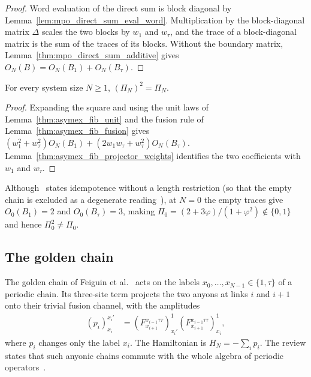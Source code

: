 \begin{proof}
    \leanok
    Word evaluation of the direct sum is block diagonal by
    Lemma~\ref{lem:mpo_direct_sum_eval_word}. Multiplication by the
    block-diagonal matrix $\Delta$ scales the two blocks by $w_1$ and
    $w_\tau$, and the trace of a block-diagonal matrix is the sum of the
    traces of its blocks. Without the boundary matrix,
    Lemma~\ref{thm:mpo_direct_sum_additive} gives
    $O_N(B)=O_N(B_1)+O_N(B_\tau)$.
\end{proof}

\begin{lemma}
    \label{thm:asymex_fib_projector_idempotent}
    \leanok
    For every system size $N\geq1$,
    $(\Pi_N)^2=\Pi_N$.
\end{lemma}

\begin{proof}
    \leanok
    Expanding the square and using the unit laws of
    Lemma~\ref{thm:asymex_fib_unit} and the fusion rule of
    Lemma~\ref{thm:asymex_fib_fusion} gives
    $(w_1^2+w_\tau^2)O_N(B_1)+(2w_1w_\tau+w_\tau^2)O_N(B_\tau)$.
    Lemma~\ref{thm:asymex_fib_projector_weights} identifies the two
    coefficients with $w_1$ and $w_\tau$.
\end{proof}

Although~\cite[Section~3.2]{Bultinck2017Anyons} states idempotence
without a length restriction (so that the empty chain is excluded as a
degenerate reading~\cite{gap:bmwshv17_fibonacci_projector_positive_length}),
at $N=0$ the empty traces give $O_0(B_1)=2$ and $O_0(B_\tau)=3$, making
$\Pi_0=(2+3\varphi)/(1+\varphi^2)\notin\{0,1\}$ and hence
$\Pi_0^2\neq\Pi_0$.

\subsection{The golden chain}

The golden chain of Feiguin et al.~\cite{Feiguin2007GoldenChain} acts on
the labels $x_0,\ldots,x_{N-1}\in\{1,\tau\}$ of a periodic chain. Its
three-site term projects the two anyons at links $i$ and $i+1$ onto their
trivial fusion channel, with the amplitudes
\begin{align}
    (p_i)^{x_i'}_{x_i}
     & =\left(F^{x_{i-1}\tau\tau}_{x_{i+1}}\right)_{x_i'}^{1}
    \left(F^{x_{i-1}\tau\tau}_{x_{i+1}}\right)_{x_i}^{1},
    \label{eq:asymex_fib_golden_term}
\end{align}
where $p_i$ changes only the label $x_i$.
The Hamiltonian is $H_N=-\sum_ip_i$. The review states that such anyonic
chains commute with the whole algebra of periodic
operators~\cite{Cirac2021Matrix}.

